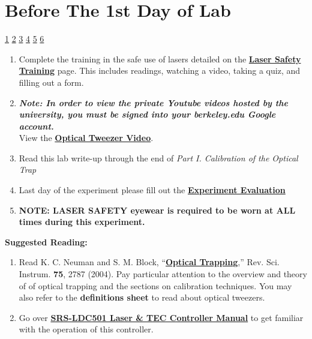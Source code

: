 \documentclass{../lab}
\begin{document}
\newpage

\section{Before The 1st Day of Lab}

\signatures \hyperlink{Trapping a Single Bead}{ 1} \hyperlink{Sensitivity vs Laser Power Plot}{ 2} \hyperlink{Sensitivities From Alpha Values}{ 3} \hyperlink{Stiffness Values}{ 4} \hyperlink{Focus Questions}{ 5} \hyperlink{Two Sets of Questions}{ 6}

\begin{enumerate}
    \item Complete the training in the safe use of lasers detailed on the \href{https://berkeley-physics111b.github.io/safety/laser/}{\textbf{Laser Safety Training}} page. This includes readings, watching a video, taking a quiz, and filling out a form.

    \item \emph{\textbf{Note: In order to view the private Youtube videos hosted by the university, you must be signed into your berkeley.edu Google account.}}\\
    View the \href{http://youtu.be/bqIBcjcAhso}{\textbf{Optical Tweezer Video}}.  

    \item Read this lab write-up through the end of \emph{Part I. Calibration of the Optical Trap}

    \item Last day of the experiment please fill out the \href{\ExperimentEvaluation}{\textbf{Experiment Evaluation}}

    \item \textbf{NOTE: LASER  SAFETY eyewear is required to be worn at ALL times during this experiment.}

\end{enumerate}

\textbf{Suggested Reading:}

\begin{enumerate}
    \item Read K. C. Neuman and S. M. Block, ``\href{https://www.damtp.cam.ac.uk/user/gold/pdfs/neumanblock.pdf}{\textbf{Optical Trapping}},'' Rev. Sci. Instrum. \textbf{75}, 2787 (2004). Pay particular attention to the overview and theory of of optical trapping and the sections on calibration techniques. You may also refer to the \textbf{definitions sheet} to read about optical tweezers.

    \item Go over \href{https://www.thinksrs.com/downloads/pdfs/manuals/LDC501m.pdf}{\textbf{SRS-LDC501 Laser \& TEC Controller Manual}} to get familiar with the operation of this controller.

\end{enumerate}
\end{document}
